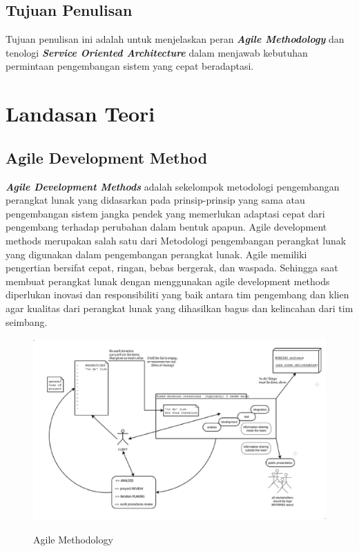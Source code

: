 \documentclass[9pt,twocolumn,twoside]{Gunadarma}
\begin{document}
\subsection{Tujuan Penulisan}
Tujuan penulisan ini adalah untuk menjelaskan peran \textbf{\textit{Agile Methodology}} dan tenologi \textbf{\textit{Service Oriented Architecture}} dalam menjawab kebutuhan permintaan pengembangan sistem yang cepat beradaptasi. 


\section{Landasan Teori}
\subsection{Agile Development Method}
\textbf{\textit{Agile Development Methods}} adalah sekelompok metodologi pengembangan perangkat lunak yang didasarkan pada prinsip-prinsip yang sama atau pengembangan sistem jangka pendek yang memerlukan adaptasi cepat dari pengembang terhadap perubahan dalam bentuk apapun. Agile development methods merupakan salah satu dari Metodologi pengembangan perangkat lunak yang digunakan dalam pengembangan perangkat lunak. Agile memiliki pengertian bersifat cepat, ringan, bebas bergerak, dan waspada. Sehingga saat membuat perangkat lunak dengan menggunakan agile development methods diperlukan inovasi dan responsibiliti yang baik antara tim pengembang dan klien agar kualitas dari perangkat lunak yang dihasilkan bagus dan kelincahan dari tim seimbang.

\begin{figure}[htbp]
\begin{center}
\includegraphics[width=1\columnwidth]{agile_methodology_for_software_development.eps} \label{fig:1-noFCase1}
\end{center}
\caption{Agile Methodology}
\end{figure}
\end{document}
